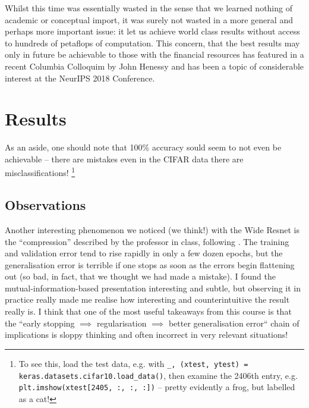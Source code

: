 \documentclass[10pt,twocolumn,letterpaper]{article}
\begin{document}
Whilst this time was essentially wasted in the sense that we learned nothing of academic or conceptual import, it was surely not wasted in a more general and perhaps more important issue: it let us achieve world class results without access to hundreds of petaflops of computation. This concern, that the best results may only in future be achievable to those with the financial resources has featured in a recent Columbia Colloquim by John Henessy and has been a topic of considerable interest at the NeurIPS 2018 Conference. %

\section{Results}

As an aside, one should note that 100\% accuracy sould seem to not even be achievable -- there are mistakes even in the CIFAR data there are misclassifications!  \footnote{To see this, load the test data, e.g. with \texttt{\_, (xtest, ytest) = keras.datasets.cifar10.load\_data()}, then examine the 2406th entry, e.g. \texttt{plt.imshow(xtest[2405, :, :, :])} -- pretty evidently a frog, but labelled as a cat!}

\subsection{Observations}

Another interesting phenomenon we noticed (we think!) with the Wide Resnet is the ``compression'' described by the professor in class, following \cite{Shwartz-Ziv2017}. The training and validation error tend to rise rapidly in only a few dozen epochs, but the generalisation error is terrible if one stops as soon as the errors begin flattening out (so bad, in fact, that we thought we had made a mistake). I found the mutual-information-based presentation interesting and subtle, but observing it in practice really made me realise how interesting and counterintuitive the result really is. I think that one of the most useful takeaways from this course is that the ``early stopping $\implies$ regularisation $\implies$ better generalisation error`` chain of implications is sloppy thinking and often incorrect in very relevant situations!
\end{document}
